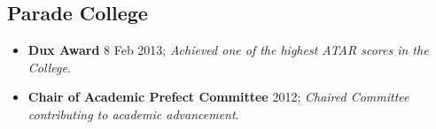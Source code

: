 \begin{multicols}{2}
\subsection{Parade College}

\begin{itemize}
  \item \textbf{Dux Award} 8 Feb 2013; \textit{Achieved one of the highest ATAR scores in the College.}
  \item \textbf{Chair of Academic Prefect Committee} 2012; \textit{Chaired Committee contributing to academic advancement}.
\end{itemize}

\vspace*{\fill}

\end{multicols}

\bigskip